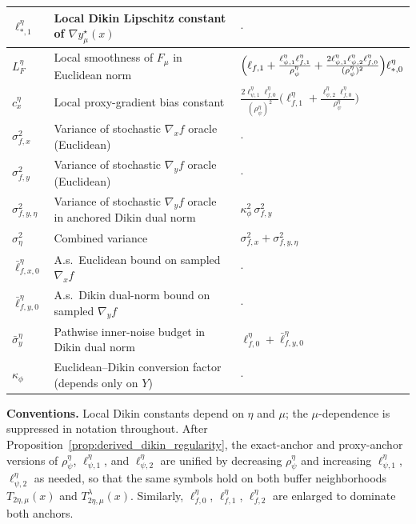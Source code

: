 \documentclass{article}
\begin{document}
\begin{table}[h]
\begin{tabularx}{\textwidth}{|l|X|l|}
\hline
$\ell_{*,1}^\eta$ & Local Dikin Lipschitz constant of $\nabla y_\mu^\star(x)$ & $\cdot$ \\
\hline
$L_F^\eta$ & Local smoothness of $F_\mu$ in Euclidean norm &
$\Bigl(\ell_{f,1}+\tfrac{\ell_{\psi,1}^\eta\ell_{f,1}^\eta}{\rho_\psi^\eta}+\tfrac{2\ell_{\psi,1}^\eta\ell_{\psi,2}^\eta\ell_{f,0}^\eta}{(\rho_\psi^\eta)^2}\Bigr)\ell_{*,0}^\eta$ \\
\hline
$c_x^\eta$ & Local proxy-gradient bias constant &
$\tfrac{2\ell_{\psi,1}^\eta\ell_{f,0}^\eta}{(\rho_\psi^\eta)^2}\bigl(\ell_{f,1}^\eta+\tfrac{\ell_{\psi,2}^\eta\ell_{f,0}^\eta}{\rho_\psi^\eta}\bigr)$ \\
\hline
$\sigma_{f,x}^2$ & Variance of stochastic $\nabla_x f$ oracle (Euclidean) & $\cdot$ \\
\hline
$\sigma_{f,y}^2$ & Variance of stochastic $\nabla_y f$ oracle (Euclidean) & $\cdot$ \\
\hline
$\sigma_{f,y,\eta}^2$ & Variance of stochastic $\nabla_y f$ oracle in anchored Dikin dual norm & $\kappa_\phi^2\,\sigma_{f,y}^2$ \\
\hline
$\sigma_\eta^2$ & Combined variance & $\sigma_{f,x}^2+\sigma_{f,y,\eta}^2$ \\
\hline
$\bar\ell_{f,x,0}^\eta$ & A.s.\ Euclidean bound on sampled $\nabla_x f$ & $\cdot$ \\
\hline
$\bar\ell_{f,y,0}^\eta$ & A.s.\ Dikin dual-norm bound on sampled $\nabla_y f$ & $\cdot$ \\
\hline
$\bar\sigma_y^\eta$ & Pathwise inner-noise budget in Dikin dual norm & $\ell_{f,0}^\eta+\bar\ell_{f,y,0}^\eta$ \\
\hline
$\kappa_\phi$ & Euclidean--Dikin conversion factor (depends only on $Y$) & $\cdot$ \\
\hline
\end{tabularx}
\label{tab:constants}
\end{table}


\noindent
\textbf{Conventions.}
Local Dikin constants depend on $\eta$ and $\mu$; the $\mu$-dependence is
suppressed in notation throughout. After
Proposition~\ref{prop:derived_dikin_regularity}, the exact-anchor and
proxy-anchor versions of $\rho_\psi^\eta$, $\ell_{\psi,1}^\eta$, and
$\ell_{\psi,2}^\eta$ are unified by decreasing $\rho_\psi^\eta$ and increasing
$\ell_{\psi,1}^\eta$, $\ell_{\psi,2}^\eta$ as needed, so that the same symbols
hold on both buffer neighborhoods $T_{2\eta,\mu}(x)$ and
$T_{2\eta,\mu}^\lambda(x)$. Similarly,
$\ell_{f,0}^\eta$, $\ell_{f,1}^\eta$, $\ell_{f,2}^\eta$ are enlarged to dominate
both anchors.
\end{document}
